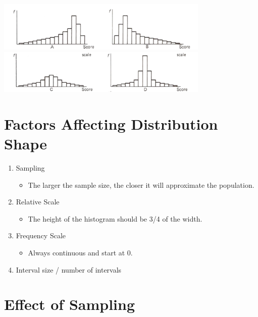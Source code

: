 \documentclass[12pt]{article}
\begin{document}
\includegraphics[width=4in]{skew_dist.png} \\
 \includegraphics[width=4in]{kurt_dist.png}

\section{Factors Affecting Distribution
Shape}\label{factors-affecting-distribution-shape}

\begin{enumerate}
\def\labelenumi{\arabic{enumi}.}
\itemsep1pt\parskip0pt
\item
  Sampling

  \begin{itemize}
  \itemsep1pt\parskip0pt
  \item
    The larger the sample size, the closer it will approximate the
    population.
  \end{itemize}
\item
  Relative Scale

  \begin{itemize}
  \itemsep1pt\parskip0pt
  \item
    The height of the histogram should be 3/4 of the width.
  \end{itemize}
\item
  Frequency Scale

  \begin{itemize}
  \itemsep1pt\parskip0pt
  \item
    Always continuous and start at 0.
  \end{itemize}
\item
  Interval size / number of intervals
\end{enumerate}

\section{Effect of Sampling}\label{effect-of-sampling}
\end{document}
